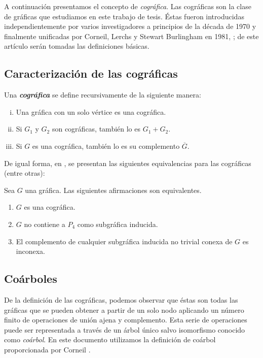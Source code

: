 A continuación presentamos el concepto de \emph{cográfica}. Las cográficas son la clase de gráficas que estudiamos en este trabajo de tesis. Éstas fueron introducidas independientemente por varios investigadores a principios de la década de 1970 y finalmente unificadas por Corneil, Lerchs y Stewart Burlingham en 1981, \cite{Corneil}; de este artículo serán tomadas las definiciones básicas.

\subsection{Caracterización de las cográficas}

Una \emph{\textbf{cográfica}} se define recursivamente de la siguiente manera:

\begin{enumerate}[(i)]
    \item Una gráfica con un solo vértice es una cográfica.
    \item Si $G_1$ y $G_2$ son cográficas, también lo es $G_1 + G_2$.
    \item Si $G$ es una cográfica, también lo es su complemento $\overline{G}$.
\end{enumerate}

De igual forma, en \cite{Corneil}, se presentan las siguientes equivalencias para las cográficas (entre otras):

\begin{theorem}
Sea $G$ una gr\'afica.   Las siguientes afirmaciones son equivalentes.
\begin{enumerate}[(1)]
    \item $G$ es una cográfica.
    \item $G$ no contiene a $P_4$ como subgráfica inducida.
    \item El complemento de cualquier subgráfica inducida no trivial conexa de $G$ es inconexa.
\end{enumerate}
\end{theorem}

\subsection{Coárboles}
 De la definición de las cográficas, podemos observar que éstas son todas las gráficas que se pueden obtener a partir de un solo nodo aplicando un número finito de operaciones de unión ajena y complemento. Esta serie de operaciones puede ser representada a través de un árbol único salvo isomorfismo conocido como \emph{coárbol}. En este documento utilizamos la definición de coárbol proporcionada por Corneil \cite{Corneil02}.

